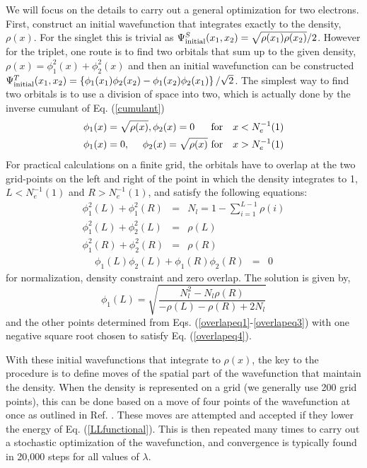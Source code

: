\documentclass[aps,pra,twocolumn,superscriptaddress]{revtex4}
\begin{document}
We will focus on the details to carry out a general optimization for two electrons. 
First, construct an initial wavefunction that integrates exactly to the
density, $\rho(x)$. For the singlet this is trivial as
$\Psi^S_{\rm initial}(x_1,x_2)=\sqrt{\rho(x_1)\rho(x_2)}/2$.
However for the triplet, one route is to find two orbitals that sum up to the given density,
$\rho(x) = \phi_1^2(x) + \phi_2^2(x)$ and then an initial wavefunction can be constructed
$\Psi^T_{\rm initial}(x_1,x_2)=\left\{\phi_1(x_1)\phi_2(x_2)-\phi_1(x_2)\phi_2(x_1)\right\}/\sqrt{2}$.
The simplest way to find two orbitals is to use a division
of space into two, which is actually done by the inverse cumulant of Eq. (\ref{cumulant})
\begin{eqnarray} 
\phi_1(x)=\sqrt{\rho(x)},\phi_2(x)=0 \ \ \ \  & {\rm\ for}& x<N_e^{-1}(1) \\
\phi_1(x)=0,\ \ \ \ \phi_2(x)=\sqrt{\rho(x)}  & {\rm\ for}& x>N_e^{-1}(1) 
\end{eqnarray}
For practical calculations on a finite grid, the orbitals have to overlap at the two grid-points on the left and right of the point in which the density integrates to 1, $L<N_e^{-1}(1)$ and $R>N_e^{-1}(1)$,
and satisfy the following equations:
\begin{eqnarray}
\label{overlapeq1}
\phi_1^2(L) + \phi_1^2(R) &=& N_l = 1-\sum_{i=1}^{L-1}\rho(i) \\
\phi_1^2(L) + \phi^2_2(L) &=& \rho(L) \\
\label{overlapeq3}
\phi_1^2(R) + \phi^2_2(R) &=& \rho(R) 
\end{eqnarray}
\begin{eqnarray}
\label{overlapeq4}
\phi_1(L)\phi_2(L)+\phi_1(R)\phi_2(R) &=& 0
\end{eqnarray}
for normalization, density constraint and zero overlap.
The solution is given by,
\begin{equation}
\phi_1(L) = \sqrt{\frac{N_l^2-N_l\rho(R)}{-\rho(L)-\rho(R)+2N_l}}
\end{equation}
and the other points determined from Eqs. (\ref{overlapeq1}-\ref{overlapeq3}) with one negative square root chosen to satisfy Eq. (\ref{overlapeq4}).

With these initial wavefunctions that integrate to $\rho(x)$, the key to the procedure is to define moves of the spatial part of the wavefunction that maintain the density. When the density is represented on a grid (we generally use 200 grid points),
this can be done based on a move of four points of the wavefunction at once
as outlined in Ref. \cite{MoriCohen1DCS}. These moves are attempted and accepted if they lower the energy of Eq. (\ref{LLfunctional}). This is then repeated many times to carry 
out a stochastic optimization of the wavefunction, and convergence is typically found in 20,000 steps for all values of $\lambda$. 
\end{document}
